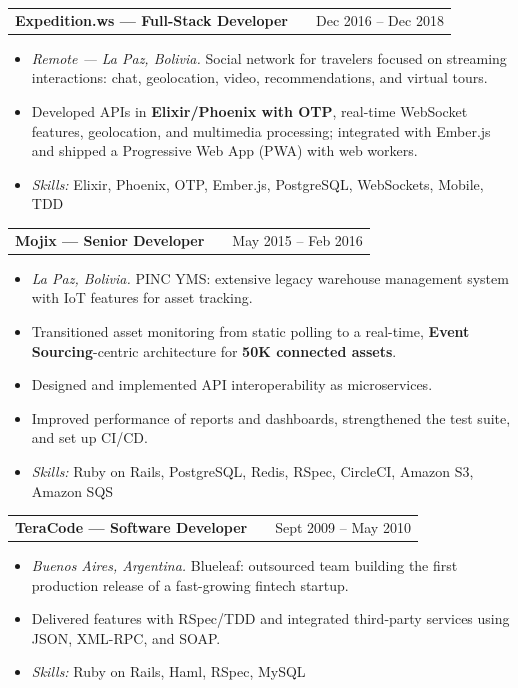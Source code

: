 \documentclass[a4paper,12pt]{article}
\makeatletter
\newcommand{\skillsfont}{\fontsize{9.6}{11.5}\selectfont}
\newenvironment{joblong}[2]
    {
    \begin{tabularx}{\linewidth}{@{}l X r@{}}
    \textbf{#1} & \hfill &  #2 \\[3.75pt]
    \end{tabularx}
    \begin{minipage}[t]{\linewidth}
    \begin{itemize}[nosep,after=\strut, leftmargin=1em, itemsep=3pt,label=--]
    }
    {
    \end{itemize}
    \end{minipage}
    }
\makeatother
\begin{document}
\begin{joblong}{Expedition.ws --- Full-Stack Developer}{Dec 2016 -- Dec 2018}
\item \textit{Remote --- La Paz, Bolivia.} Social network for travelers focused on
      streaming interactions: chat, geolocation, video, recommendations, and
      virtual tours.
\item Developed APIs in \textbf{Elixir/Phoenix with OTP}, real-time WebSocket
      features, geolocation, and multimedia processing; integrated with Ember.js
      and shipped a Progressive Web App (PWA) with web workers.
\par\vspace{6pt}\item[]\skillsfont\textit{Skills:} Elixir, Phoenix, OTP, Ember.js, PostgreSQL, WebSockets, Mobile, TDD
\end{joblong}

\begin{joblong}{Mojix --- Senior Developer}{May 2015 -- Feb 2016}
\item \textit{La Paz, Bolivia.} PINC YMS: extensive legacy warehouse management system
      with IoT features for asset tracking.
\item Transitioned asset monitoring from static polling to a real-time,
      \textbf{Event Sourcing}-centric architecture for \textbf{50K connected assets}.
\item Designed and implemented API interoperability as microservices.
\item Improved performance of reports and dashboards, strengthened the test
      suite, and set up CI/CD.
\par\vspace{6pt}\item[]\skillsfont\textit{Skills:} Ruby on Rails, PostgreSQL, Redis, RSpec, CircleCI, Amazon S3, Amazon SQS
\end{joblong}

\begin{joblong}{TeraCode --- Software Developer}{Sept 2009 -- May 2010}
\item \textit{Buenos Aires, Argentina.} Blueleaf: outsourced team building the first
      production release of a fast-growing fintech startup.
\item Delivered features with RSpec/TDD and integrated third-party services
      using JSON, XML-RPC, and SOAP.
\par\vspace{6pt}\item[]\skillsfont\textit{Skills:} Ruby on Rails, Haml, RSpec, MySQL
\end{joblong}
\end{document}
